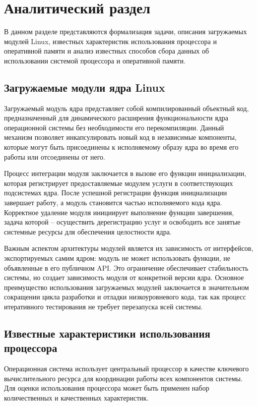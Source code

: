 \chapter{Аналитический раздел}

В данном разделе представляются формализация задачи, описания загружаемых модулей Linux, известных характеристик использования процессора и оперативной памяти и анализ известных способов сбора данных об использовании системой процессора и оперативной памяти.

\section{Загружаемые модули ядра Linux}

Загружаемый модуль ядра представляет собой компилированный объектный код, предназначенный для динамического расширения функциональности ядра операционной системы без необходимости его перекомпиляции. Данный механизм позволяет инкапсулировать новый код в независимые компоненты, которые могут быть присоединены к исполняемому образу ядра во время его работы или отсоединены от него.

Процесс интеграции модуля заключается в вызове его функции инициализации, которая регистрирует предоставляемые модулем услуги в соответствующих подсистемах ядра. После успешной регистрации функция инициализации завершает работу, а модуль становится частью исполняемого кода ядра. Корректное удаление модуля инициирует выполнение функции завершения, задача которой -- осуществить дерегистрацию услуг и освободить все занятые системные ресурсы для обеспечения целостности ядра.

Важным аспектом архитектуры модулей является их зависимость от интерфейсов, экспортируемых самим ядром: модуль не может использовать функции, не объявленные в его публичном API. Это ограничение обеспечивает стабильность системы, но создает зависимость модуля от конкретной версии ядра. Основное преимущество использования загружаемых модулей заключается в значительном сокращении цикла разработки и отладки низкоуровневого кода, так как процесс итеративного тестирования не требует перезапуска всей системы.

\newpage

\section{Известные характеристики использования процессора}

Операционная система использует центральный процессор в качестве ключевого вычислительного ресурса для координации работы всех компонентов системы. Для оценки использования процессора может быть применен набор количественных и качественных характеристик.

